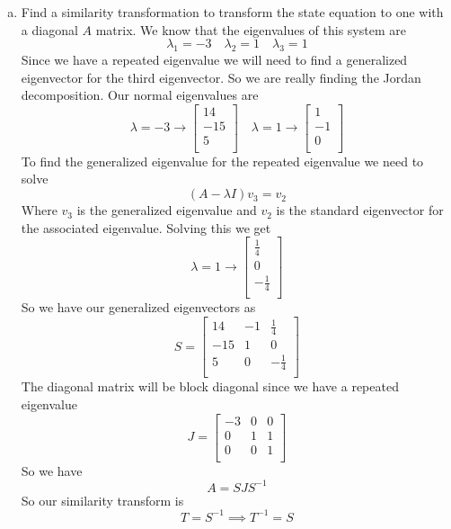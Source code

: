 \documentclass{article}
\begin{document}
\begin{enumerate}[(a)]
\item Find a similarity transformation to transform the state equation to one with a diagonal $A$ matrix.
\newline
\newline
We know that the eigenvalues of this system are
$$ \lambda_1 = -3 \quad \lambda_2 = 1 \quad \lambda_3 = 1 $$
Since we have a repeated eigenvalue we will need to find a generalized eigenvector for the third eigenvector.
So we are really finding the Jordan decomposition.
Our normal eigenvalues are
$$
\lambda = -3 \to
\begin{bmatrix}
14 \\
-15 \\
5 \\
\end{bmatrix}
\quad
\lambda = 1 \to
\begin{bmatrix}
1 \\
-1 \\
0 \\
\end{bmatrix}
$$
To find the generalized eigenvalue for the repeated eigenvalue we need to solve
$$ (A-\lambda I)v_3 = v_2 $$
Where $v_3$ is the generalized eigenvalue and $v_2$ is the standard eigenvector for the associated eigenvalue.
Solving this we get
$$
\lambda = 1 \to
\begin{bmatrix}
\frac{1}{4} \\
0 \\
-\frac{1}{4} \\
\end{bmatrix}
$$
So we have our generalized eigenvectors as
$$
S =
\begin{bmatrix}
14 & -1 & \frac{1}{4} \\
-15 & 1 & 0 \\
5 & 0 & -\frac{1}{4} \\
\end{bmatrix}
$$
The diagonal matrix will be block diagonal since we have a repeated eigenvalue
$$
J =
\begin{bmatrix}
-3 & 0 & 0 \\
 0 & 1 & 1 \\
 0 & 0 & 1 \\
\end{bmatrix}
$$
So we have
$$ A = SJS^{-1} $$
So our similarity transform is
$$ T = S^{-1} \implies T^{-1} = S $$



\end{enumerate}
\end{document}
